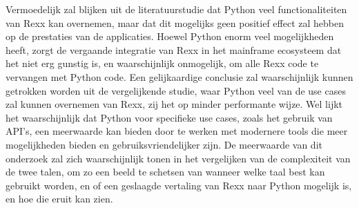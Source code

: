 Vermoedelijk zal blijken uit de literatuurstudie dat Python veel functionaliteiten van Rexx kan overnemen, maar dat dit mogelijks geen positief effect zal hebben op de prestaties van de applicaties. Hoewel Python enorm veel mogelijkheden heeft, zorgt de vergaande integratie van Rexx in het mainframe ecosysteem dat het niet erg gunstig is, en waarschijnlijk onmogelijk, om alle Rexx code te vervangen met Python code. Een gelijkaardige conclusie zal waarschijnlijk kunnen getrokken worden uit de vergelijkende studie, waar Python veel van de use cases zal kunnen overnemen van Rexx, zij het op minder performante wijze. Wel lijkt het waarschijnlijk dat Python voor specifieke use cases, zoals het gebruik van API's, een meerwaarde kan bieden door te werken met modernere tools die meer mogelijkheden bieden en gebruiksvriendelijker zijn. De meerwaarde van dit onderzoek zal zich waarschijnlijk tonen in het vergelijken van de complexiteit van de twee talen, om zo een beeld te schetsen van wanneer welke taal best kan gebruikt worden, en of een geslaagde vertaling van Rexx naar Python mogelijk is, en hoe die eruit kan zien. 

